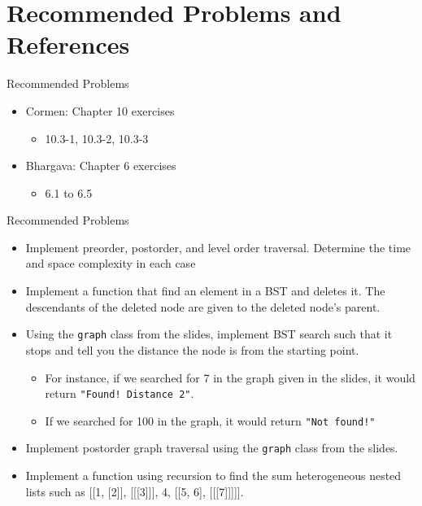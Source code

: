 \documentclass[
  ignorenonframetext,
]{beamer}
\providecommand{\tightlist}{%
  \setlength{\itemsep}{0pt}\setlength{\parskip}{0pt}}\usepackage{longtable,booktabs,array}
\begin{document}
\hypertarget{recommended-problems-and-references}{%
\section{Recommended Problems and
References}\label{recommended-problems-and-references}}

\begin{frame}{Recommended Problems}
\protect\hypertarget{recommended-problems}{}
\begin{itemize}
\item
  Cormen: Chapter 10 exercises

  \begin{itemize}
  \tightlist
  \item
    10.3-1, 10.3-2, 10.3-3
  \end{itemize}
\item
  Bhargava: Chapter 6 exercises

  \begin{itemize}
  \tightlist
  \item
    6.1 to 6.5
  \end{itemize}
\end{itemize}
\end{frame}

\begin{frame}[fragile]{Recommended Problems}
\protect\hypertarget{recommended-problems-1}{}
\begin{itemize}
\item
  Implement preorder, postorder, and level order traversal. Determine
  the time and space complexity in each case
\item
  Implement a function that find an element in a BST and deletes it. The
  descendants of the deleted node are given to the deleted node's
  parent.
\item
  Using the \texttt{graph} class from the slides, implement BST search
  such that it stops and tell you the distance the node is from the
  starting point.

  \begin{itemize}
  \item
    For instance, if we searched for 7 in the graph given in the slides,
    it would return \texttt{"Found!\ Distance\ 2"}.
  \item
    If we searched for 100 in the graph, it would return
    \texttt{"Not\ found!"}
  \end{itemize}
\item
  Implement postorder graph traversal using the \texttt{graph} class
  from the slides.
\item
  Implement a function using recursion to find the sum heterogeneous
  nested lists such as {[}{[}1, {[}2{]}{]}, {[}{[}{[}3{]}{]}{]}, 4,
  {[}{[}5, 6{]}, {[}{[}{[}7{]}{]}{]}{]}{]}.
\end{itemize}
\end{frame}
\end{document}
